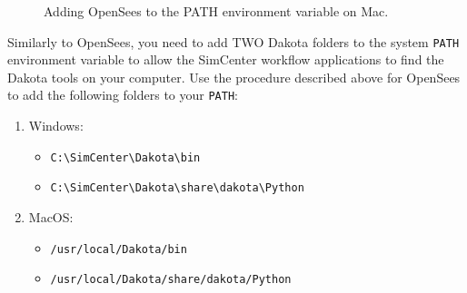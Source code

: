 \begin{figure}[!htbp]
  \caption{Adding OpenSees to the PATH environment variable on Mac.}
  \label{fig:dakota_installation}
\end{figure}

Similarly to OpenSees, you need to add TWO Dakota folders to the
system \texttt{PATH} environment variable to allow the SimCenter
workflow applications to find the Dakota tools on your computer. Use
the procedure described above for OpenSees to add the following
folders to your \texttt{PATH}:

\begin{enumerate}
\item Windows:
\begin{itemize}
    \item \texttt{C:\textbackslash SimCenter\textbackslash Dakota\textbackslash bin}
    \item \texttt{C:\textbackslash SimCenter\textbackslash Dakota\textbackslash share\textbackslash dakota\textbackslash Python}
\end{itemize}

\item MacOS:
\begin{itemize}
    \item \texttt{/usr/local/Dakota/bin}
    \item \texttt{/usr/local/Dakota/share/dakota/Python}
\end{itemize}
\end{enumerate}

